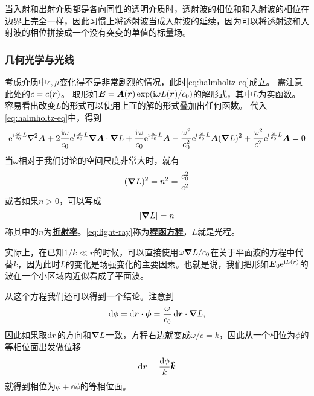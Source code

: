 \documentclass[UTF8, a4paper]{ctexart}
\newcommand*{\ii}{\mathrm{i}}
\newcommand*{\ee}{\mathrm{e}}
\newcommand*{\concept}[1]{\underline{\textbf{#1}}}
\begin{document}
当入射和出射介质都是各向同性的透明介质时，透射波的相位和和入射波的相位在边界上完全一样，因此习惯上将透射波当成入射波的延续，因为可以将透射波和入射波的相位拼接成一个没有突变的单值的标量场。

\subsubsection{几何光学与光线}

考虑介质中$\epsilon, \mu$变化得不是非常剧烈的情况，此时\eqref{eq:halmholtz-eq}成立。
需注意此处的$c=c(\vb*{r})$。
取形如$\vb*{E} = \vb*{A}(\vb*{r}) \exp (\ii \omega L(\vb*{r}) / c_0)$的解形式，其中$L$为实函数。
容易看出改变$L$的形式可以使用上面的解的形式叠加出任何函数。
代入\eqref{eq:halmholtz-eq}中，得到
\[
    \ee^{\ii \frac{\omega}{c_0} L} \laplacian \vb*{A} 
    + 2 \frac{\ii \omega}{c_0} \ee^{\ii \frac{\omega}{c_0} L} \grad{\vb*{A}} \cdot \grad{L} 
    + \frac{\ii \omega}{c_0} \ee^{\ii \frac{\omega}{c_0} L} \vb*{A} 
    - \frac{\omega^2}{c_0^2} \ee^{\ii \frac{\omega}{c_0} L} \vb*{A} (\grad{L})^2 
    + \frac{\omega^2}{c^2} \ee^{\ii \frac{\omega}{c_0} L} \vb*{A} = 0
\]
当$\omega$相对于我们讨论的空间尺度非常大时，就有
\begin{equation}
    (\grad{L})^2 = n^2 = \frac{c_0^2}{c^2}
    \label{eq:optical-distance}
\end{equation}
或者如果$n>0$，可以写成
\[
    \abs{\grad{L}} = n
\]
称其中的$n$为\concept{折射率}。\eqref{eq:light-ray}称为\concept{程函方程}，$L$就是光程。

实际上，在已知$1/k \ll r$的时候，可以直接使用$\omega\grad{L}/c_0$在关于平面波的方程中代替$k$，因为此时$L$的变化是场强变化的主要因素。也就是说，我们把形如$\vb*{E}_0 \ee^{\ii L(r)}$的波在一个小区域内近似看成了平面波。

从这个方程我们还可以得到一个结论。注意到
\[
    \dd{\phi} = \dd{\vb*{r}} \cdot \vb*{\phi} = \frac{\omega}{c_0} \dd{\vb*{r}} \cdot \grad{L},
\]
因此如果取$\dd{\vb*{r}}$的方向和$\grad{L}$一致，方程右边就变成$\omega / c = k$，因此从一个相位为$\phi$的等相位面出发做位移
\begin{equation}
    \dd{\vb*{r}} = \frac{\dd{\phi}}{k}\vu*{k}
    \label{eq:phrase-movement}
\end{equation}
就得到相位为$\phi + \dd{\phi}$的等相位面。
\end{document}
